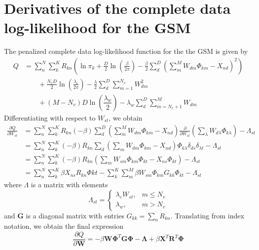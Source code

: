 \chapter{Derivatives of the complete data log-likelihood for the GSM}\label{appendix:gsm-deriv}


The penalized complete data log-likelihood function for the the GSM is given by
\begin{equation}
\begin{aligned}
    Q &= \sum_n^N\sum_k^K R_{kn} \left(\ln\pi_k + \frac{D}{2}\ln\left(\frac{\beta}{2\pi}\right) - \frac{\beta}{2}\sum_d^D\left(\sum_m^M W_{dm}\Phi_{km} - X_{nd}\right)^2\right) \\
    &\qquad + \frac{N_vD}{2}\ln\left(\frac{\lambda_e}{2\pi}\right) - \frac{\lambda}{2}\sum_d^D \sum_{m=1}^{N_v} W_{dm}^2  \\
    &\qquad + (M-N_v)D\ln\left(\dfrac{\lambda_w}{2}\right) - \lambda_w\sum_d^D\sum_{m=N_v+1}^{M} W_{dm}
\end{aligned}
\end{equation}
Differentiating with respect to $W_{st}$, we obtain
\begin{align*}
  \frac{\partial Q}{\partial W_{st}} &= \sum_n^N\sum_k^K R_{kn}(-\beta)\sum_d^D \left( \sum_m^M W_{dm}\Phi_{km} - X_{nd}\right)\frac{\partial}{\partial W_{st}}\left( \sum_\lambda W_{d\lambda}\Phi_{k\lambda} \right) - \Lambda_{st} \\
                                     &= \sum_n^N\sum_k^K (-\beta)R_{kn}\sum_d\left( \sum_m W_{dm}\Phi_{km} - X_{nd} \right)\Phi_{k\lambda}\delta_{ds}\delta_{\lambda t} - \Lambda_{st} \\
                                     &= \sum_n^N\sum_k^K (-\beta)R_{kn}\left( \sum_m W_{sm}\Phi_{km}\Phi_{kt} - X_{ns}\Phi_{kt}\right) - \Lambda_{st} \\
  &= \sum_n^N\sum_k^K \beta X_{ns}R_{kn}\Phi{kt} - \sum_k^K\sum_m^M\beta W_{sm}\Phi_{km}G_{kk}\Phi_{kt} - \Lambda_{st}
\end{align*}
where $\Lambda$ is a matrix with elements
\begin{equation}
  \Lambda_{st} = \begin{cases}
    \lambda_eW_{st}, & m\leq N_v \\
    \lambda_w, & m > N_v
  \end{cases}
\end{equation}
and $\mathbf{G}$ is a diagonal matrix with entries $G_{kk} = \sum_n R_{kn}$.
Translating from index notation, we obtain the final expression
\begin{equation}
    \frac{\partial Q}{\partial \mathbf{W}} = -\beta \mathbf{W}\mathbf{\Phi}^T\mathbf{G}\mathbf{\Phi} - \mathbf{\Lambda} + \beta \mathbf{X}^T\mathbf{R}^T\mathbf{\Phi}
\end{equation}

